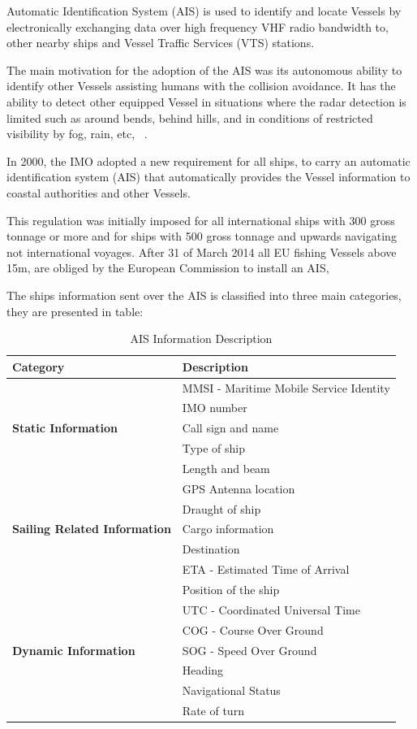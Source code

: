Automatic Identification System (AIS) is used to identify and locate Vessels by electronically exchanging data over high frequency VHF radio bandwidth to, other nearby ships and Vessel Traffic Services (VTS) stations.

The main motivation for the adoption of the AIS was its autonomous ability to identify other Vessels assisting humans with the collision avoidance. It has the ability to detect other equipped Vessel in situations where the radar detection is limited such as around bends, behind hills, and in conditions of restricted visibility by fog, rain, etc, ~\cite{Harati-Mokhtari2007}. 

In 2000, the IMO adopted a new requirement for all ships, to carry an automatic identification system (AIS) that automatically provides the Vessel information to coastal authorities and other Vessels.

This regulation was initially imposed for all international ships with 300 gross tonnage or more and for ships with 500 gross tonnage and upwards navigating not international voyages. After 31 of March 2014 all EU fishing Vessels above 15m, are obliged by the European Commission to install an AIS, ~\cite{EC2018}

The ships information sent over the AIS is classified into three main categories, they are presented in table:
\begin{table}[H]
\centering
\caption{AIS Information Description}
\label{Table: AIS Categories}
\begin{tabular}{|l|l|}
\hline
\textbf{Category} & \textbf{Description} \\ \hline
 & MMSI - Maritime Mobile Service Identity \\ \cline{2-2} 
 & IMO number \\ \cline{2-2} 
\textbf{Static Information} & Call sign and name \\ \cline{2-2} 
 & Type of ship \\ \cline{2-2} 
 & Length and beam \\ \cline{2-2} 
 & GPS Antenna location \\ \hline
 & Draught of ship \\ \cline{2-2} 
\textbf{Sailing Related Information} & Cargo information \\ \cline{2-2} 
 & Destination \\ \cline{2-2} 
 & ETA - Estimated Time of Arrival \\ \hline
 & Position of the ship \\ \cline{2-2} 
 & UTC - Coordinated Universal Time \\ \cline{2-2} 
 & COG - Course Over Ground \\ \cline{2-2} 
\textbf{Dynamic Information} & SOG - Speed Over Ground \\ \cline{2-2} 
 & Heading \\ \cline{2-2}
 & Navigational Status \\ \cline{2-2}
 & Rate of turn \\ \hline
\end{tabular}
\end{table}

